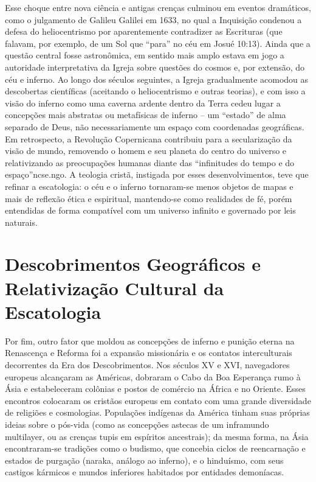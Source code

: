 Esse choque entre nova ciência e antigas crenças culminou em eventos dramáticos, como o julgamento de Galileu Galilei em 1633, no qual a Inquisição condenou a defesa do heliocentrismo por aparentemente contradizer as Escrituras (que falavam, por exemplo, de um Sol que “para” no céu em Josué 10:13). Ainda que a questão central fosse astronômica, em sentido mais amplo estava em jogo a autoridade interpretativa da Igreja sobre questões do cosmos e, por extensão, do céu e inferno. Ao longo dos séculos seguintes, a Igreja gradualmente acomodou as descobertas científicas (aceitando o heliocentrismo e outras teorias), e com isso a visão do inferno como uma caverna ardente dentro da Terra cedeu lugar a concepções mais abstratas ou metafísicas de inferno -- um “estado” de alma separado de Deus, não necessariamente um espaço com coordenadas geográficas. Em retrospecto, a Revolução Copernicana contribuiu para a secularização da visão de mundo, removendo o homem e seu planeta do centro do universo e relativizando as preocupações humanas diante das “infinitudes do tempo e do espaço”ncse.ngo. A teologia cristã, instigada por esses desenvolvimentos, teve que refinar a escatologia: o céu e o inferno tornaram-se menos objetos de mapas e mais de reflexão ética e espiritual, mantendo-se como realidades de fé, porém entendidas de forma compatível com um universo infinito e governado por leis naturais.

\section{Descobrimentos Geográficos e Relativização Cultural da Escatologia}

Por fim, outro fator que moldou as concepções de inferno e punição eterna na Renascença e Reforma foi a expansão missionária e os contatos interculturais decorrentes da Era dos Descobrimentos. Nos séculos XV e XVI, navegadores europeus alcançaram as Américas, dobraram o Cabo da Boa Esperança rumo à Ásia e estabeleceram colônias e postos de comércio na África e no Oriente. Esses encontros colocaram os cristãos europeus em contato com uma grande diversidade de religiões e cosmologias. Populações indígenas da América tinham suas próprias ideias sobre o pós-vida (como as concepções astecas de um inframundo multilayer, ou as crenças tupis em espíritos ancestrais); da mesma forma, na Ásia encontraram-se tradições como o budismo, que concebia ciclos de reencarnação e estados de purgação (naraka, análogo ao inferno), e o hinduísmo, com seus castigos kármicos e mundos inferiores habitados por entidades demoníacas.

